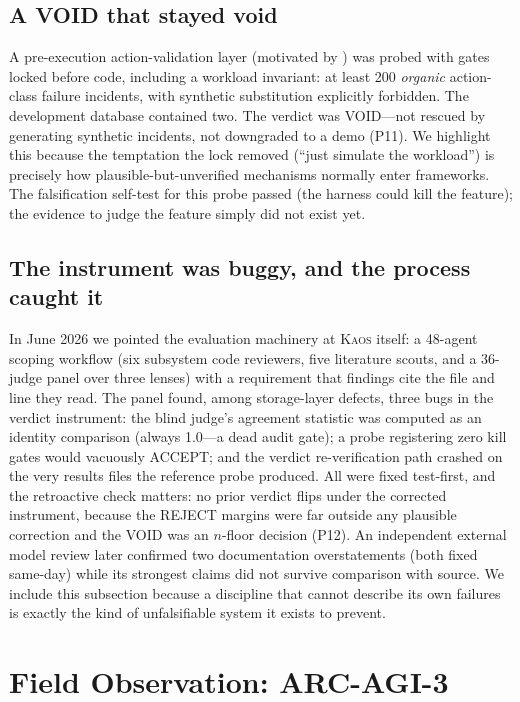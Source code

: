 \documentclass[11pt]{article}
\newcommand{\kaos}{\textsc{Kaos}}
\begin{document}
\subsection{A VOID that stayed void}

A pre-execution action-validation layer (motivated by \citealp{lifeharness2026}) was probed with gates locked before code, including a workload invariant: at least 200 \emph{organic} action-class failure incidents, with synthetic substitution explicitly forbidden. The development database contained two. The verdict was VOID---not rescued by generating synthetic incidents, not downgraded to a demo (P11). We highlight this because the temptation the lock removed (``just simulate the workload'') is precisely how plausible-but-unverified mechanisms normally enter frameworks. The falsification self-test for this probe passed (the harness could kill the feature); the evidence to judge the feature simply did not exist yet.

\subsection{The instrument was buggy, and the process caught it}
\label{sec:selfaudit}

In June 2026 we pointed the evaluation machinery at \kaos{} itself: a 48-agent scoping workflow (six subsystem code reviewers, five literature scouts, and a 36-judge panel over three lenses) with a requirement that findings cite the file and line they read. The panel found, among storage-layer defects, three bugs in the verdict instrument: the blind judge's agreement statistic was computed as an identity comparison (always 1.0---a dead audit gate); a probe registering zero kill gates would vacuously ACCEPT; and the verdict re-verification path crashed on the very results files the reference probe produced. All were fixed test-first, and the retroactive check matters: no prior verdict flips under the corrected instrument, because the REJECT margins were far outside any plausible correction and the VOID was an $n$-floor decision (P12). An independent external model review later confirmed two documentation overstatements (both fixed same-day) while its strongest claims did not survive comparison with source. We include this subsection because a discipline that cannot describe its own failures is exactly the kind of unfalsifiable system it exists to prevent.

\section{Field Observation: ARC-AGI-3}
\label{sec:arc}
\end{document}
